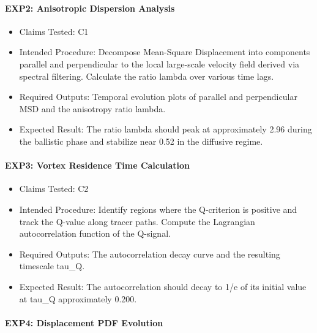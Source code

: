 \documentclass[11pt]{article}
\begin{document}
\paragraph{EXP2: Anisotropic Dispersion Analysis}

\begin{itemize}

\item Claims Tested: C1

\item Intended Procedure: Decompose Mean-Square Displacement into components parallel and perpendicular to the local large-scale velocity field derived via spectral filtering. Calculate the ratio lambda over various time lags.

\item Required Outputs: Temporal evolution plots of parallel and perpendicular MSD and the anisotropy ratio lambda.

\item Expected Result: The ratio lambda should peak at approximately 2.96 during the ballistic phase and stabilize near 0.52 in the diffusive regime.

\end{itemize}

\paragraph{EXP3: Vortex Residence Time Calculation}

\begin{itemize}

\item Claims Tested: C2

\item Intended Procedure: Identify regions where the Q-criterion is positive and track the Q-value along tracer paths. Compute the Lagrangian autocorrelation function of the Q-signal.

\item Required Outputs: The autocorrelation decay curve and the resulting timescale tau\_Q.

\item Expected Result: The autocorrelation should decay to 1/e of its initial value at tau\_Q approximately 0.200.

\end{itemize}

\paragraph{EXP4: Displacement PDF Evolution}
\end{document}
